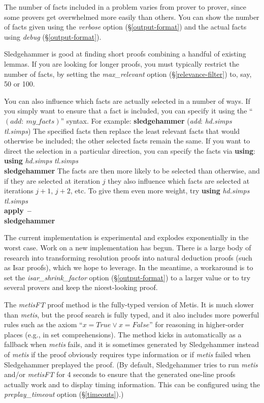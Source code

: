 \documentclass[a4paper,12pt]{article}
\begin{document}
The number of facts included in a problem varies from prover to prover, since
some provers get overwhelmed more easily than others. You can show the number of
facts given using the \textit{verbose} option (\S\ref{output-format}) and the
actual facts using \textit{debug} (\S\ref{output-format}).

Sledgehammer is good at finding short proofs combining a handful of existing
lemmas. If you are looking for longer proofs, you must typically restrict the
number of facts, by setting the \textit{max\_relevant} option
(\S\ref{relevance-filter}) to, say, 50 or 100.

You can also influence which facts are actually selected in a number of ways. If
you simply want to ensure that a fact is included, you can specify it using the
``$(\textit{add}{:}~\textit{my\_facts})$'' syntax. For example:
%
\prew
\textbf{sledgehammer} (\textit{add}: \textit{hd.simps} \textit{tl.simps})
\postw
%
The specified facts then replace the least relevant facts that would otherwise be
included; the other selected facts remain the same.
If you want to direct the selection in a particular direction, you can specify
the facts via \textbf{using}:
%
\prew
\textbf{using} \textit{hd.simps} \textit{tl.simps} \\
\textbf{sledgehammer}
\postw
%
The facts are then more likely to be selected than otherwise, and if they are
selected at iteration $j$ they also influence which facts are selected at
iterations $j + 1$, $j + 2$, etc. To give them even more weight, try
%
\prew
\textbf{using} \textit{hd.simps} \textit{tl.simps} \\
\textbf{apply}~\textbf{--} \\
\textbf{sledgehammer}
\postw


The current implementation is experimental and explodes exponentially in the
worst case. Work on a new implementation has begun. There is a large body of
research into transforming resolution proofs into natural deduction proofs (such
as Isar proofs), which we hope to leverage. In the meantime, a workaround is to
set the \textit{isar\_shrink\_factor} option (\S\ref{output-format}) to a larger
value or to try several provers and keep the nicest-looking proof.


The \textit{metisFT} proof method is the fully-typed version of Metis. It is
much slower than \textit{metis}, but the proof search is fully typed, and it
also includes more powerful rules such as the axiom ``$x = \mathit{True}
\mathrel{\lor} x = \mathit{False}$'' for reasoning in higher-order places (e.g.,
in set comprehensions). The method kicks in automatically as a fallback when
\textit{metis} fails, and it is sometimes generated by Sledgehammer instead of
\textit{metis} if the proof obviously requires type information or if
\textit{metis} failed when Sledgehammer preplayed the proof. (By default,
Sledgehammer tries to run \textit{metis} and/or \textit{metisFT} for 4 seconds
to ensure that the generated one-line proofs actually work and to display timing
information. This can be configured using the \textit{preplay\_timeout} option
(\S\ref{timeouts}).)
\end{document}
